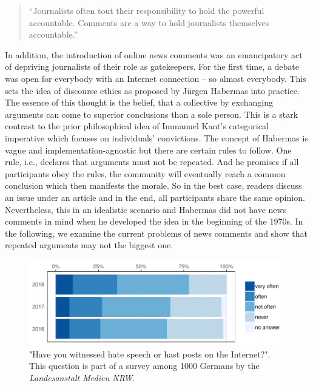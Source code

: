 \begin{quote}
``Journalists often tout their responsibility to hold the powerful accountable. Comments are a way to hold journalists themselves accountable.''
\end{quote}

In addition, the introduction of online news comments was an emancipatory act of depriving journalists of their role as gatekeepers. For the first time, a debate was open for everybody with an Internet connection -- so almost everybody. This sets the idea of discourse ethics as proposed by J{\"u}rgen Habermas into practice.
The essence of this thought is the belief, that a collective by exchanging arguments can come to superior conclusions than a sole person.
This is a stark contrast to the prior philosophical idea of Immanuel Kant's categorical imperative which focuses on individuals' convictions. The concept of Habermas is vague and implementation-agnostic but there are certain rules to follow. One rule, i.e., declares that arguments must not be repeated. And he promises if all participants obey the rules, the community will eventually reach a common conclusion which then manifests the morale. So in the best case, readers discuss an issue under an article and in the end, all participants share the same opinion.
Nevertheless, this in an idealistic scenario and Habermas did not have news comments in mind when he developed the idea in the beginning of the 1970s.
In the following, we examine the current problems of news comments and show that repeated arguments may not the biggest one.

\begin{figure}[h]
\includegraphics[width=1\textwidth]{graphs/hate_on_the_web/hate_paper.pdf}
\caption[Caption for LOF]{"Have you witnessed hate speech or hast posts on the Internet?". This question is part of a survey among 1000 Germans by the \textit{Landesanstalt Medien NRW}.\protect\footnotemark}
\label{Fig:hate_on_the_web}
\end{figure}


